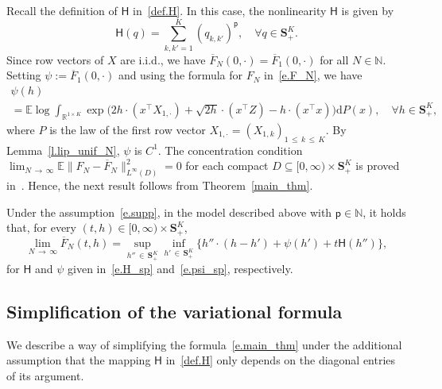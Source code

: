 \documentclass[10pt]{amsart}
\theoremstyle{definition}\newtheorem{defi}[theo]{Definition}\newtheorem{rema}[theo]{Remark}\newtheorem{exam}[theo]{Example}\newtheorem{exem}[theo]{Example}\newtheorem{nota}[theo]{Notation}
\newcommand{\N}{\mathbb{N}}
\newcommand{\R}{\mathbb{R}}
\newcommand{\E}{\mathbb{E}}
\renewcommand{\S}{\mathbf{S}}
\renewcommand{\d}{\mathrm{d}}
\renewcommand{\H}{\mathsf{H}}
\newcommand{\sfp}{\mathsf{p}}
\renewcommand{\leq}{\leqslant}
\renewcommand{\subset}{\subseteq}
\renewcommand{\bar}{\overline}
\newcommand{\Ll}{\left}
\newcommand{\Rr}{\right}
\let\oldforall\forall
\renewcommand*{\forall}{\mathrel{\oldforall}}
\begin{document}
Recall the definition of $\H$ in~\eqref{def.H}. In this case, the nonlinearity $\H$ is given by
\begin{equation}\label{e.H_sp}
\H(q) = \sum_{k,k'=1}^K\left(q_{k,k'}\right)^\sfp,\quad\forall q\in \S^K_+.
\end{equation}
Since row vectors of $X$ are i.i.d., we have $\bar F_N(0,\cdot)= \bar F_1(0,\cdot)$ for all $N\in\N$. Setting $\psi := \bar F_1(0,\cdot)$ and using the formula for $F_N$ in~\eqref{e.F_N}, we have
\begin{multline}\label{e.psi_sp}
\psi(h)\\
= \E \log \int_{\R^{1\times K}} \exp\bigg(2h\cdot (x^\intercal X_{1,\cdot})+\sqrt{2h}\cdot(x^\intercal Z)-h\cdot(x^\intercal x) \bigg) \d P(x),\quad\forall h\in\S^K_+,
\end{multline}
where $P$ is the law of the first row vector $X_{1,\cdot} = (X_{1,k})_{1\,\leq\,k\,\leq\,K}$. By Lemma~\ref{l.lip_unif_N}, $\psi$ is $C^1$. The concentration condition $\lim_{N\,\to\,\infty}\E\|F_N-\bar F_N\|^2_{L^\infty(D)}=0$ for each compact $D\subset [0,\infty)\times \S^K_+$ is proved in~\cite[Lemma~C.1]{HBJ}. Hence, the next result follows from Theorem~\ref{main_thm}.
\begin{coro}
Under the assumption~\eqref{e.supp}, in the model described above with $\sfp\in\N$, it holds that, for every $(t,h)\in[0,\infty)\times\S^K_+$,
\[
\lim_{N\,\to\,\infty}\bar F_N(t,h) = \sup_{h''\,\in\,\S^K_+}\inf_{h'\,\in\,\S^K_+}\big\{h''\cdot \Ll(h-h'\Rr)+\psi(h')+t\H(h'')\big\},
\]
for $\H$ and $\psi$ given in~\eqref{e.H_sp} and~\eqref{e.psi_sp}, respectively.
\end{coro}


\subsection{Simplification of the variational formula}



We describe a way of simplifying the formula~\eqref{e.main_thm} under the additional assumption that the mapping $\H$ in~\eqref{def.H} only depends on the diagonal entries of its argument.
\end{document}
